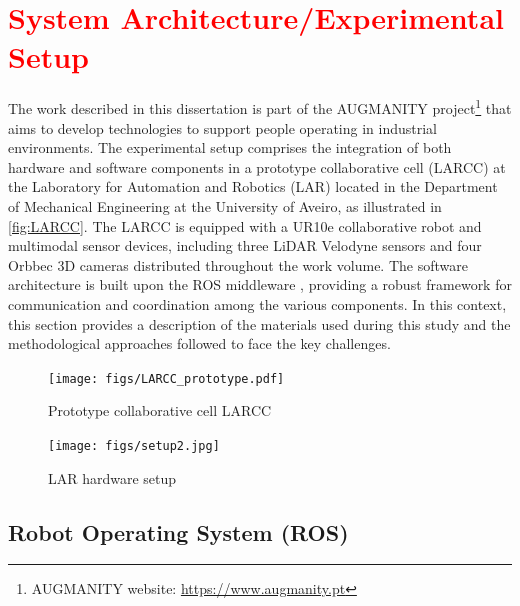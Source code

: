 \section{\textcolor{red}{System Architecture/Experimental Setup}}
\label{section:system_architecture}

The work described in this dissertation is part of the AUGMANITY project\footnote{AUGMANITY website: \url{https://www.augmanity.pt}} that aims to develop technologies to support people operating in industrial environments. The experimental setup comprises the integration of both hardware and software components in a prototype collaborative cell (LARCC) at the Laboratory for Automation and Robotics (LAR) located in the Department of Mechanical Engineering at the University of Aveiro, as illustrated in \autoref{fig:LARCC}. The LARCC is equipped with a UR10e collaborative robot and multimodal sensor devices, including three LiDAR Velodyne sensors and four Orbbec 3D cameras distributed throughout the work volume. The software architecture is built upon the ROS middleware \cite{Quigley2009}, providing a robust framework for communication and coordination among the various components. In this context, this section provides a description of the materials used during this study and the methodological approaches followed to face the key challenges. 

\begin{figure}[ht]
    \centering
    \texttt{[image: figs/LARCC\_prototype.pdf]}
    \caption{Prototype collaborative cell LARCC}
    \label{fig:LARCC}
\end{figure}

\begin{figure}[!ht]
\centerline{\texttt{[image: figs/setup2.jpg]}}
\caption[setup]{LAR hardware setup}
\label{fig:LARCC}
\end{figure}
\fi

\subsection{Robot Operating System (ROS)}

